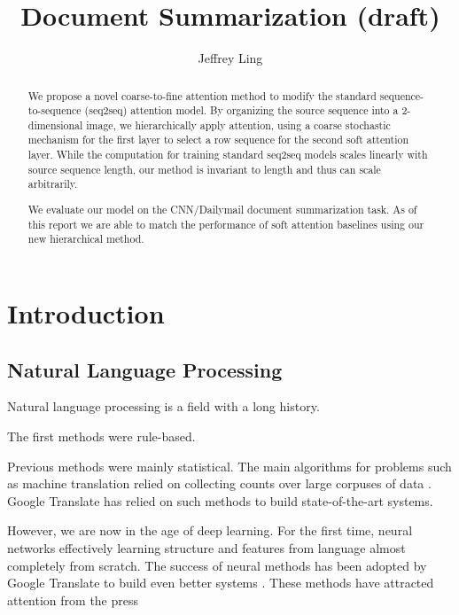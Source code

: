 \documentclass[11pt]{report}
\title{Document Summarization (draft)}
\author{Jeffrey Ling}
\begin{document}
\maketitle{}

\begin{abstract} %
We propose a novel coarse-to-fine attention method to modify the standard sequence-to-sequence (seq2seq) attention model. By organizing the source sequence into a 2-dimensional image, we hierarchically apply attention, using a coarse stochastic mechanism for the first layer to select a row sequence for the second soft attention layer. While the computation for training standard seq2seq models scales linearly with source sequence length, our method is invariant to length and thus can scale arbitrarily.

We evaluate our model on the CNN/Dailymail document summarization task. As of this report we are able to match the performance of soft attention baselines using our new hierarchical method.
\end{abstract}

\tableofcontents{}




\chapter{Introduction}

\section{Natural Language Processing}

Natural language processing is a field with a long history. 


The first methods were rule-based. %

Previous methods were mainly statistical. The main algorithms for problems such as machine translation  relied on collecting counts over large corpuses of data \citep{Brown1993}. Google Translate has relied on such methods to build state-of-the-art systems.

However, we are now in the age of deep learning. For the first time, neural networks effectively learning structure and features from language almost completely from scratch. The success of neural methods has been adopted by Google Translate to build even better systems \cite{GoogleTranslate2016}. These methods have attracted attention from the press %
\end{document}

